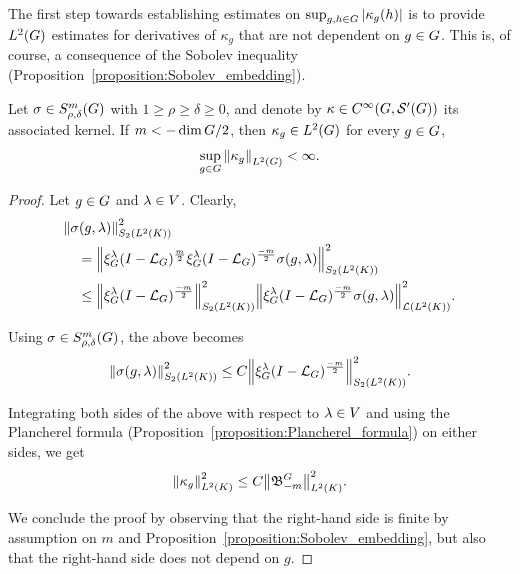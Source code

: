The first step towards establishing estimates on $\sup_{g, h \in \Group} \abs {\kappa_g(h)}$
is to provide $\Lebesgue 2 \Group$ estimates for derivatives of $\kappa_g$ that are not dependent on $g \in \Group$.
This is, of course, a consequence of the Sobolev inequality (Proposition~\ref{proposition:Sobolev_embedding}).

\begin{proposition}
\label{proposition:L2_bound_on_the_kernel}
    Let $\sigma \in \SymbolClass m {\rho, \delta}$ with $1 \geq \rho \geq \delta \geq 0$,
    and denote by $\kappa \in \SmoothFunctions {\Group, \TemperedDistributions \Group}$ its associated kernel.
    If $m < -\dim \Group / 2$,
    then $\kappa_g \in \Lebesgue 2 \Group$ for every $g \in \Group$,
    \begin{align*}
        \sup_{g \in \Group} \norm [\Lebesgue 2 \Group] {\kappa_g} < \infty.
    \end{align*}
\end{proposition}
\begin{proof}
    Let $g \in \Group$ and $\lambda \in \VectorSpace$.
    Clearly,
    \begin{align*}
        &\norm [\SchattenClasses 2 {\Lebesgue 2 \CompactGroup}] {\sigma(g, \lambda)}^2\\
        &\quad= \norm [\SchattenClasses 2 {\Lebesgue 2 \CompactGroup}] {\Rep \lambda \BesselPotential m \Rep \lambda \BesselPotential {-m} \sigma(g, \lambda)}^2\\
        &\quad\leq
        \norm [\SchattenClasses 2 {\Lebesgue 2 \CompactGroup}] {\Rep \lambda \BesselPotential {-m}}^2
        \norm [\Lin {\Lebesgue 2 \CompactGroup}] {\Rep \lambda \BesselPotential {-m} \sigma(g, \lambda)}^2.
    \end{align*}

    Using $\sigma \in \SymbolClass m {\rho, \delta}$,
    the above becomes
    \begin{align*}
        \norm [\SchattenClasses 2 {\Lebesgue 2 \CompactGroup}] {\sigma(g, \lambda)}^2
        \leq C \norm [\SchattenClasses 2 {\Lebesgue 2 \CompactGroup}] {\Rep \lambda \BesselPotential {-m}}^2.
    \end{align*}

    Integrating both sides of the above with respect to $\lambda \in \VectorSpace$
    and using the Plancherel formula (Proposition~\ref{proposition:Plancherel_formula}) on either sides,
    we get
    \begin{align*}
        \norm [\Lebesgue 2 \CompactGroup] {\kappa_g}^2 \leq C \norm [\Lebesgue 2 \CompactGroup] {\BesselPotentialKernel {-m}}^2.
    \end{align*}

    We conclude the proof by observing that the right-hand side is finite by assumption on $m$ and Proposition~\ref{proposition:Sobolev_embedding},
    but also that the right-hand side does not depend on $g$.
\end{proof}

